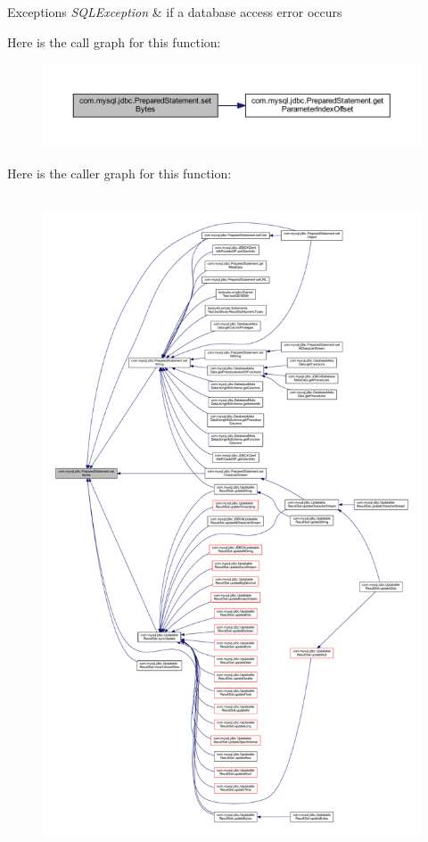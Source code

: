 \begin{DoxyExceptions}{Exceptions}
{\em S\+Q\+L\+Exception} & if a database access error occurs \\
\hline
\end{DoxyExceptions}
Here is the call graph for this function\+:
\nopagebreak
\begin{figure}[H]
\begin{center}
\leavevmode
\includegraphics[width=350pt]{classcom_1_1mysql_1_1jdbc_1_1_prepared_statement_aaaac7a11d71f1c60bc57f96271582061_cgraph}
\end{center}
\end{figure}
Here is the caller graph for this function\+:
\nopagebreak
\begin{figure}[H]
\begin{center}
\leavevmode
\includegraphics[height=550pt]{classcom_1_1mysql_1_1jdbc_1_1_prepared_statement_aaaac7a11d71f1c60bc57f96271582061_icgraph}
\end{center}
\end{figure}
